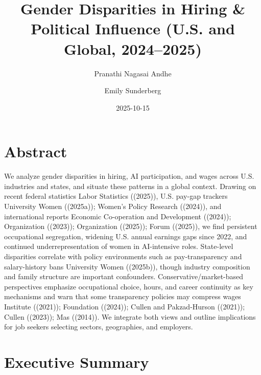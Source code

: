 \documentclass[
  letterpaper,
  DIV=11,
  numbers=noendperiod]{scrartcl}
\title{Gender Disparities in Hiring \& Political Influence (U.S. and
Global, 2024--2025)}
\author{Pranathi Nagasai Andhe \and Emily Sunderberg}
\date{2025-10-15}
\renewcommand*\contentsname{Table of contents}
\newcommand\contentsname{Table of contents}
\begin{document}
\maketitle

\renewcommand*\contentsname{Table of contents}
{
\hypersetup{linkcolor=}
\setcounter{tocdepth}{3}
\tableofcontents
}

\section{Abstract}\label{abstract}

We analyze gender disparities in hiring, AI participation, and wages
across U.S. industries and states, and situate these patterns in a
global context. Drawing on recent federal statistics Labor Statistics
((2025)), U.S. pay-gap trackers University Women ((2025a)); Women's
Policy Research ((2024)), and international reports Economic
Co-operation and Development ((2024)); Organization ((2023));
Organization ((2025)); Forum ((2025)), we find persistent occupational
segregation, widening U.S. annual earnings gaps since 2022, and
continued underrepresentation of women in AI-intensive roles.
State-level disparities correlate with policy environments such as
pay-transparency and salary-history bans University Women ((2025b)),
though industry composition and family structure are important
confounders. Conservative/market-based perspectives emphasize
occupational choice, hours, and career continuity as key mechanisms and
warn that some transparency policies may compress wages Institute
((2021)); Foundation ((2024)); Cullen and Pakzad-Hurson ((2021)); Cullen
((2023)); Mas ((2014)). We integrate both views and outline implications
for job seekers selecting sectors, geographies, and employers.

\section{Executive Summary}\label{executive-summary}
\end{document}
